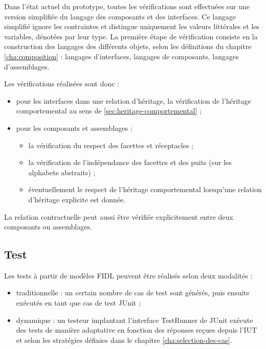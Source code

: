 Dans l'\'etat actuel du prototype, toutes les v\'erifications sont
effectu\'ees sur une version simplifi\'ee du langage des composants
et des interfaces. Ce langage simplifi\'e ignore les contraintes et
distingue uniquement les valeurs litt\'erales et les variables,
d\'enot\'ees par leur type. La premi\`ere \'etape de
v\'erification consiste en la construction des langages des
diff\'erents objets, selon les d\'efinitions du chapitre
\ref{cha:composition} : langages d'interfaces, langages de composants,
langages d'assemblages. 

Les v\'erifications r\'ealis\'ees sont donc :
\begin{itemize}
  \item pour les interfaces dans une relation d'h\'eritage, la
    v\'erification de l'h\'eritage comportemental au sens de
    \ref{sec:heritage-comportemental} ;
  \item pour les composants et assemblages :
    \begin{itemize}
      \item la v\'erification du respect des facettes et r\'eceptacles
        ;
      \item la v\'erification de l'ind\'ependance des facettes et des
        puits (sur les alphabets abstraits) ;
      \item \'eventuellement le respect de l'h\'eritage comportemental
        lorsqu'une relation d'h\'eritage explicite est donn\'ee.
    \end{itemize}
\end{itemize}

La relation contractuelle peut aussi \^etre v\'erifi\'ee
explicitement entre deux composants ou assemblages. 

\subsection{Test}

Les tests \`a partir de mod\`eles \textsf{FIDL} peuvent \^etre
r\'ealis\'es selon deux modalit\'es :
\begin{itemize}
  \item traditionnelle : un certain nombre de cas de
  test sont g\'en\'er\'es, puis ensuite ex\'ecut\'es en tant que
  cas de test \textsf{JUnit} ;
\item dynamique : un testeur implantant l'interface
  \textsf{TestRunner} de \textsf{JUnit} ex\'ecute des tests de
  mani\`ere adaptative en fonction des r\'eponses re\c{c}ues depuis
  l'\textsf{IUT} et selon les strat\'egies d\'efinies dans le
  chapitre \ref{cha:selection-des-cas}.
\end{itemize}

